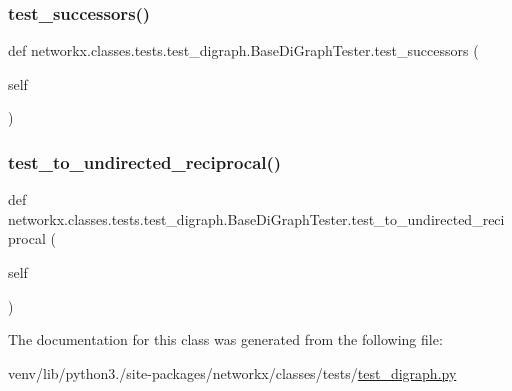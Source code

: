 \subsubsection{\texorpdfstring{test\+\_\+successors()}{test\_successors()}}
{\footnotesize\ttfamily def networkx.\+classes.\+tests.\+test\+\_\+digraph.\+Base\+Di\+Graph\+Tester.\+test\+\_\+successors (\begin{DoxyParamCaption}\item[{}]{self }\end{DoxyParamCaption})}

\mbox{\label{classnetworkx_1_1classes_1_1tests_1_1test__digraph_1_1BaseDiGraphTester_a5ebea18748d5ee8b38b05eb1944aa624}} 
\subsubsection{\texorpdfstring{test\+\_\+to\+\_\+undirected\+\_\+reciprocal()}{test\_to\_undirected\_reciprocal()}}
{\footnotesize\ttfamily def networkx.\+classes.\+tests.\+test\+\_\+digraph.\+Base\+Di\+Graph\+Tester.\+test\+\_\+to\+\_\+undirected\+\_\+reciprocal (\begin{DoxyParamCaption}\item[{}]{self }\end{DoxyParamCaption})}



The documentation for this class was generated from the following file\+:\begin{DoxyCompactItemize}
\item 
venv/lib/python3./site-\/packages/networkx/classes/tests/\hyperlink{test__digraph_8py}{test\+\_\+digraph.\+py}\end{DoxyCompactItemize}
